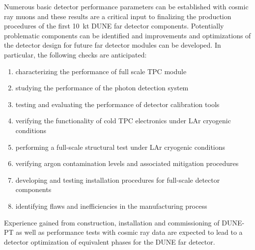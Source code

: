 Numerous basic detector performance parameters can be established with cosmic ray muons and these results are a critical input to finalizing the production procedures of the first 10~kt DUNE far detector components. Potentially problematic components can be identified and improvements and optimizations of the detector design for future far detector modules can be developed. 
%
In particular, the following checks are anticipated:
\begin{enumerate}
 \item characterizing the performance of full scale TPC module
 \item studying the performance of the photon detection system
 \item testing and evaluating the performance of detector calibration tools
  \item verifying the functionality of cold TPC electronics under LAr cryogenic conditions
  \item performing a full-scale structural test under LAr cryogenic conditions
  \item verifying argon contamination levels and associated mitigation procedures
  \item developing and testing installation procedures for full-scale detector components
  \item identifying flaws and inefficiencies in the manufacturing process
\end{enumerate}

Experience gained from construction, installation and commissioning of DUNE-PT 
as well as performance tests with cosmic ray data are expected to lead to a detector optimization of equivalent phases 
for the DUNE far detector. 

